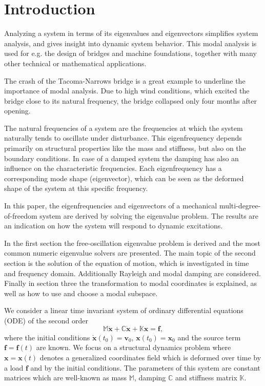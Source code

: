 \documentclass[conference]{journal}
\newcommand{\bb}[1]{\mathbb{#1}}
\newcommand{\B}[1]{\mathbf{#1}}
\newcommand{\Bx}{\B{x}}
\newcommand{\M}{\bb{M}}
\newcommand{\C}{\bb{C}}
\newcommand{\K}{\bb{K}}
\begin{document}
	\section{Introduction}
	Analyzing a system in terms of its eigenvalues and eigenvectors simplifies system analysis, and gives insight into dynamic system behavior.
	This modal analysis is used for e.g. the design of bridges and machine foundations, together with many other technical or mathematical applications. 
	
	The crash of the Tacoma-Narrows bridge is a great example to underline the importance of modal analysis. Due to high wind conditions, which excited the bridge close to its natural frequency, the bridge collapsed only four months after opening. 

	The natural frequencies of a system are the frequencies at which the system naturally tends to oscillate under disturbance. This  eigenfrequency depends primarily on structural properties like the mass and stiffness, but also on the boundary conditions. In case of a damped system the damping has also an influence on the characteristic frequencies. Each eigenfrequency has a corresponding mode shape (eigenvector), which can be seen as the deformed shape of the system at this specific frequency. 
	
	In this paper, the eigenfrequencies and eigenvectors of a mechanical multi-degree-of-freedom system are derived by solving the eigenvalue problem. The results are an indication on how the system will respond to dynamic excitations.
	
	In the first section the free-oscillation eigenvalue problem is derived and the most common numeric eigenvalue solvers are presented. The main topic of the second section is the solution of the equation of motion, which is investigated in time and frequency domain. Additionally Rayleigh and modal damping are considered. Finally in section three the transformation to modal coordinates is explained, as well as how to use and choose a modal subspace.

	We consider a linear time invariant system of ordinary differential equations (ODE) of the second order
	\begin{equation} \label{eq:2system}
	\M \ddot{\Bx} + \C \dot{\Bx} + \K \Bx = \B{f},
	\end{equation}
	where the initial conditions $\dot{\Bx}(t_0)=\B{v}_0$, $\Bx(t_0)=\Bx_0$ and the source term $\B{f}=\B{f}(t)$ are known. We focus on a structural dynamics problem where $\Bx=\Bx(t)$ denotes a generalized coordinates field which is deformed over time by a load $\B{f}$ and by the initial conditions. The parameters of this system are constant matrices which are well-known as mass $\M$, damping $\C$ and stiffness matrix $\K$.
\end{document}
